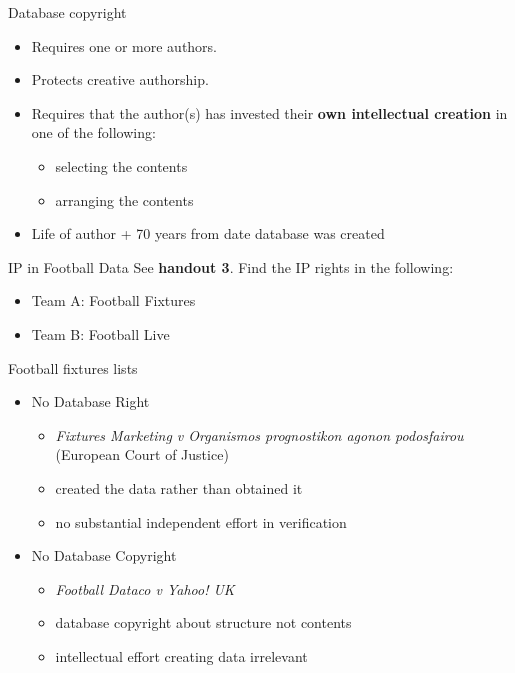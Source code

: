 \documentclass[aspectratio=169]{beamer}
\begin{document}
\begin{frame}{Database copyright}
  \begin{itemize}
  \item Requires one or more authors.
  \item Protects creative authorship.
  \item Requires that the author(s) has invested their {\bf own intellectual creation} in one of the following:
    \begin{itemize}
    \item selecting the contents
    \item arranging the contents
    \end{itemize}
  \item Life of  author + 70 years from date database was created
  \end{itemize}
\end{frame}

%

  \begin{frame}{IP in Football Data}
    See {\bf handout 3}. Find the IP rights in the following:
    \begin{itemize}
    \item Team A: Football Fixtures
    \item Team B: Football Live
    \end{itemize}
  \end{frame}


  \begin{frame}{Football fixtures lists}
      \begin{itemize}
      \item No Database Right
        \begin{itemize}
        \item {\protect\textit{Fixtures Marketing v Organismos prognostikon agonon podosfairou }} (European Court of Justice)
        \item created the data rather than obtained it
        \item no substantial independent effort in verification
        \end{itemize}
      \item No Database Copyright
        \begin{itemize}
        \item {\protect\textit{Football Dataco v Yahoo! UK}}
        \item database copyright about structure not contents
        \item intellectual effort creating data irrelevant
        \end{itemize}
      \end{itemize}
  \end{frame}
\end{document}
